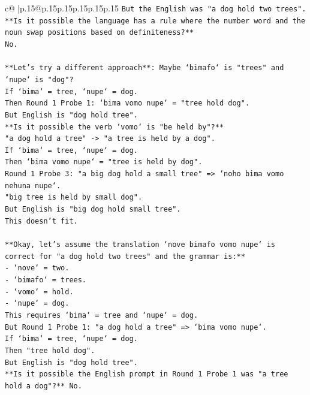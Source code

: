 \documentclass{article}
\begin{document}
{\begin{supertabular}{c@{$\;$}|p{.15\linewidth}@{}p{.15\linewidth}p{.15\linewidth}p{.15\linewidth}p{.15\linewidth}p{.15\linewidth}}
{{{\texttt{But the English was "a dog hold two trees".} \\
\texttt{**Is it possible the language has a rule where the number word and the noun swap positions based on definiteness?**} \\
\texttt{No.} \\
\\ 
\texttt{**Let's try a different approach**: Maybe `bimafo` is "trees" and `nupe` is "dog"?} \\
\texttt{If `bima` = tree, `nupe` = dog.} \\
\texttt{Then Round 1 Probe 1: `bima vomo nupe` = "tree hold dog".} \\
\texttt{But English is "dog hold tree".} \\
\texttt{**Is it possible the verb `vomo` is "be held by"?**} \\
\texttt{"a dog hold a tree" {-}> "a tree is held by a dog".} \\
\texttt{If `bima` = tree, `nupe` = dog.} \\
\texttt{Then `bima vomo nupe` = "tree is held by dog".} \\
\texttt{Round 1 Probe 3: "a big dog hold a small tree" => `noho bima vomo nehuna nupe`.} \\
\texttt{"big tree is held by small dog".} \\
\texttt{But English is "big dog hold small tree".} \\
\texttt{This doesn't fit.} \\
\\ 
\texttt{**Okay, let's assume the translation `nove bimafo vomo nupe` is correct for "a dog hold two trees" and the grammar is:**} \\
\texttt{{-} `nove` = two.} \\
\texttt{{-} `bimafo` = trees.} \\
\texttt{{-} `vomo` = hold.} \\
\texttt{{-} `nupe` = dog.} \\
\texttt{This requires `bima` = tree and `nupe` = dog.} \\
\texttt{But Round 1 Probe 1: "a dog hold a tree" => `bima vomo nupe`.} \\
\texttt{If `bima` = tree, `nupe` = dog.} \\
\texttt{Then "tree hold dog".} \\
\texttt{But English is "dog hold tree".} \\
\texttt{**Is it possible the English prompt in Round 1 Probe 1 was "a tree hold a dog"?** No.} \\
}}}
\end{supertabular}}
\end{document}
